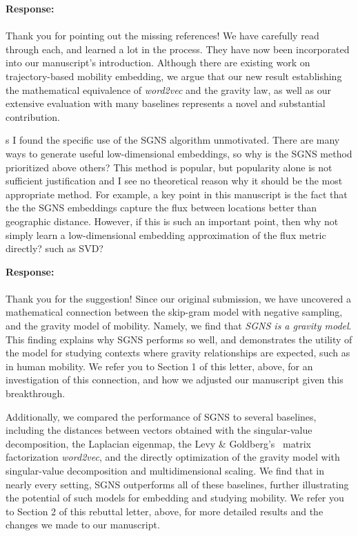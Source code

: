 \documentclass[12pt,a4paper]{article}
\newcommand{\response}[1]{{\noindent \textbf{Response:} \\ \\ \noindent #1}}
\newcommand{\rcomment}[1]{%
\vspace{10pt}
\begin{sectionbox}
s #1
\end{sectionbox}
}
\begin{document}
\response{Thank you for pointing out the missing references!
	We have carefully read through each, and learned a lot in the process.
	They have now been incorporated into our manuscript's introduction.
	Although there are existing work on trajectory-based mobility embedding, we argue that our new result establishing the mathematical equivalence of \textit{word2vec} and the gravity law, as well as our extensive evaluation with many baselines represents a novel and substantial contribution.
}

\rcomment{
	I found the specific use of the SGNS algorithm unmotivated. There are many ways to generate useful low-dimensional embeddings, so why is the SGNS method prioritized above others? This method is popular, but popularity alone is not sufficient justification and I see no theoretical reason why it should be the most appropriate method. For example, a key point in this manuscript is the fact that the the SGNS embeddings capture the flux between locations better than geographic distance. However, if this is such an important point, then why not simply learn a low-dimensional embedding approximation of the flux metric directly? such as SVD?
}

\response{
	Thank you for the suggestion!
	Since our original submission, we have uncovered a mathematical connection between the skip-gram model with negative sampling, and the gravity model of mobility.
	Namely, we find that \emph{SGNS is a gravity model}.
	This finding explains why SGNS performs so well, and demonstrates the utility of the model for studying contexts where gravity relationships are expected, such as in human mobility.
	We refer you to Section 1 of this letter, above, for an investigation of this connection, and how we adjusted our manuscript given this breakthrough.

	Additionally, we compared the performance of SGNS to several baselines, including the distances between vectors obtained with the singular-value decomposition, the Laplacian eigenmap, the Levy
	\& Goldberg's~\autocite{levy2014neural} matrix factorization \textit{word2vec}, and the directly optimization of the gravity model with singular-value decomposition and multidimensional scaling.
	We find that in nearly every setting, SGNS outperforms all of these baselines, further illustrating the potential of such models for embedding and studying mobility.
	We refer you to Section 2 of this rebuttal letter, above, for more detailed results and the changes we made to our manuscript.
}
\end{document}
